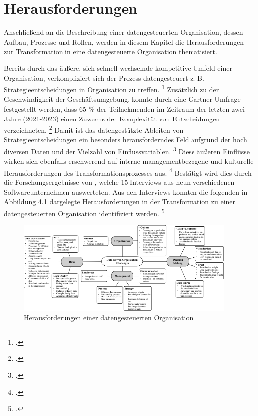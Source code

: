 \chapter[Herausforderungen]{Herausforderungen}

Anschließend an die Beschreibung einer datengesteuerten Organisation, dessen Aufbau, Prozesse und Rollen, werden in diesem Kapitel die Herausforderungen zur Transformation in eine datengesteuerte Organisation thematisiert.

Bereits durch das äußere, sich schnell wechselnde kompetitive Umfeld einer Organisation, verkompliziert sich der Prozess datengesteuert z. B. Strategieentscheidungen in Organisation zu treffen. \footcite[Vgl.][S. 2]{Pratt.2023} 
Zusätzlich zu der Geschwindigkeit der Geschäftsumgebung, konnte durch eine Gartner Umfrage festgestellt werden, dass 65 \% der Teilnehmenden im Zeitraum der letzten zwei Jahre (2021-2023) einen Zuwachs der Komplexität von Entscheidungen verzeichneten. \footcite[Vgl.][S. 65]{Pratt.2023}
Damit ist das datengestützte Ableiten von Strategieentscheidungen ein besonders herausforderndes Feld aufgrund der hoch diversen Daten und der Vielzahl von Einflussvariablen. \footcite[Vgl.][S. 3]{Pratt.2023}
Diese äußeren Einflüsse wirken sich ebenfalls erschwerend auf interne managementbezogene und kulturelle Herausforderungen des Transformationsprozesses aus. \footcite[Vgl.][S. 15]{Dalpiaz.2020}
Bestätigt wird dies durch die Forschungsergebnisse von , welche 15 Interviews aus neun verschiedenen Softwareunternehmen auswerteten.
Aus den Interviews konnten die folgenden in Abbildung 4.1 dargelegte Herausforderungen in der Transformation zu einer datengesteuerten Organisation identifiziert werden. \footcite[][S. 9]{Dalpiaz.2020}

\begin{figure}[htb]
    \centering
    \includegraphics[width=0.95\textwidth]{graphics/DDO challenges.png}
    \caption{Herausforderungen einer datengesteuerten Organisation}
    \label{fig:DDOs challenges}
\end{figure}


